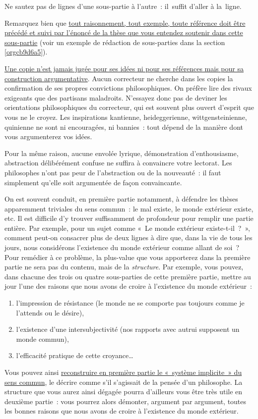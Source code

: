\documentclass[a4paper,12pt]{article}
\begin{document}
Ne sautez pas de lignes d'une sous-partie à l'autre : il suffit d'aller
à la ligne.

Remarquez bien que \uline{tout raisonnement, tout exemple, toute référence
doit être précédé et suivi par l'énoncé de la thèse que vous entendez
soutenir dans cette sous-partie} (voir un exemple de rédaction de
sous-parties dans la section \ref{orgcb9d6a5}).

\uline{Une copie n'est jamais jugée pour ses idées ni pour ses références mais
pour sa construction argumentative}. Aucun correcteur ne cherche dans
les copies la confirmation de ses propres convictions philosophiques. On
préfère lire des rivaux exigeants que des partisans maladroits.
N'essayez donc pas de deviner les orientations philosophiques du
correcteur, qui est souvent plus ouvert d'esprit que vous ne le croyez.
Les inspirations kantienne, heideggerienne, wittgensteinienne, quinienne
ne sont ni encouragées, ni bannies : tout dépend de la manière dont vous
argumenterez vos idées.

Pour la même raison, aucune envolée lyrique, démonstration
d'enthousiasme, abstraction délibérément confuse ne suffira à convaincre
votre lectorat. Les philosophes n'ont pas peur de l'abstraction ou de la
nouveauté : il faut simplement qu'elle soit argumentée de façon
convaincante.

On est souvent conduit, en première partie notamment, à défendre les
thèses apparemment triviales du sens commun : le mal existe, le monde
extérieur existe, etc. Il est difficile d'y trouver suffisamment de
profondeur pour remplir une partie entière. Par exemple, pour un sujet
comme « Le monde extérieur existe-t-il ? », comment peut-on consacrer
plus de deux lignes à dire que, dans la vie de tous les jours, nous
considérons l'existence du monde extérieur comme allant de soi ?
Pour remédier à ce problème, la plus-value que vous apporterez dans la
première partie ne sera pas du contenu, mais de la \emph{structure}. Par
exemple, vous pouvez, dans chacune des trois ou quatre sous-parties de
cette première partie, mettre au jour l'une des raisons que nous avons
de croire à l'existence du monde extérieur : 
\begin{enumerate}
\item l'impression de résistance (le monde ne se comporte pas toujours
comme je l'attends ou le désire),
\item l'existence d'une intersubjectivité (nos rapports avec autrui
supposent un monde commun),
\item l'efficacité pratique de cette croyance\ldots{}
\end{enumerate}
Vous pouvez ainsi \uline{reconstruire en première partie le « système
implicite » du sens commun}, le décrire comme s'il s'agissait de la
pensée d'un philosophe. La structure que vous aurez ainsi dégagée pourra
d'ailleurs vous être très utile en deuxième partie : vous pourrez alors
démonter, argument par argument, toutes les bonnes raisons que nous
avons de croire à l'existence du monde extérieur.
\end{document}
